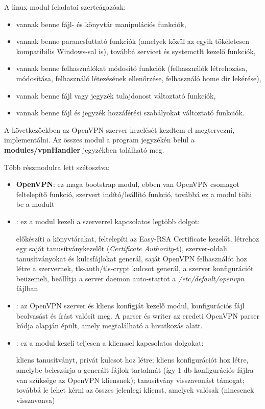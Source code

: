 A linux modul feladatai szerteágazóak:

\begin{itemize}
	\item vannak benne fájl- és könyvtár manipulációs funkciók,
	\item vannak benne parancsfuttató funkciók (amelyek közül az egyik tökéletesen kompatibilis Windows-sal is), továbbá servicet és systemctlt kezelő funkciók,
	\item vannak benne felhasználókat módosító funkciók (felhasználók létrehozása, módosítása, felhasználó létezésének ellenőrzése, felhasználó home dir lekérése),
	\item vannak benne fájl vagy jegyzék tulajdonost változtató funkciók,
	\item vannak benne fájl és jegyzék hozzáférési szabályokat változtató funkciók.
\end{itemize}


A következőekben az OpenVPN szerver kezelését kezdtem el megtervezni, implementálni. Az összes modul a program jegyzékén belül a \textbf{modules/vpnHandler} jegyzékben található meg.

Több részmodulra lett szétosztva:
\begin{itemize}
	\item \textbf{OpenVPN}: ez maga bootstrap modul, ebben van OpenVPN csomagot feltelepítő funkció, szervert indító/leállító funkció, továbbá ez a modul tölti be a  modult
	\item \textbf{}: ez a modul kezeli a szerverrel kapcsolatos legtöbb dolgot:
	
	előkészíti a könyvtárakat, feltelepíti az Easy-RSA Certificate kezelőt, létrehoz egy saját tanusítványkezelőt (\textit{Certificate Authority}-t), szerver-oldali tanusítványokat és kulcsfájlokat generál, saját OpenVPN felhasználót hoz létre a szervernek, tls-auth/tls-crypt kulcsot generál, a szerver konfigurációt beüzemeli, beállítja a server daemon auto-startot a \textit{/etc/default/openvpn} fájlban

	\item \textbf{}: az OpenVPN szerver és kliens konfigját kezelő modul, konfigurációs fájl beolvasást és írást valósít meg. A parser és writer az eredeti OpenVPN parser kódja alapján épült, amely megtalálható a \cite{openvpn_parser} hivatkozás alatt.
	\item \textbf{}: ez a modul kezeli teljesen a klienssel kapcsolatos dolgokat:
	
	kliens tanusítványt, privát kulcsot hoz létre; kliens konfigurációt hoz létre, amelybe beleszúrja a generált fájlok tartalmát (így 1 db konfigurációs fájlra van szüksége az OpenVPN kliensnek); tanusítvány visszavonást támogat; továbbá le lehet kérni az összes jelenlegi klienst, amelyek valósak (nincsenek visszavonva)
\end{itemize}


